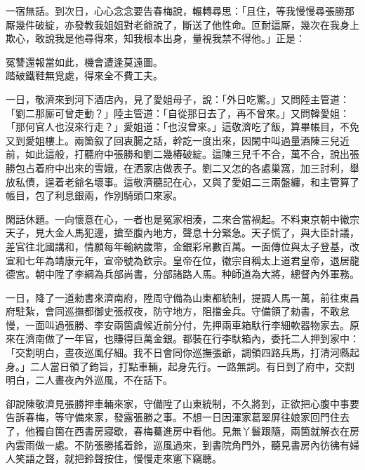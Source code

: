 一宿無話。到次日，心心念念要告春梅說，輾轉尋思：「且住，等我慢慢尋張勝那厮幾件破綻，亦發教我姐姐對老爺說了，斷送了他性命。{}叵耐這厮，幾次在我身上欺心，敢說我是他尋得來，知我根本出身，量視我禁不得他。」正是：

\begin{myquote}
冤讐還報當如此，機會遭逢莫遠圖。\\踏破鐵鞋無覓處，得來全不費工夫。
\end{myquote}

一日，敬濟來到河下酒店內，見了愛姐母子，說：「外日吃驚。」又問陸主管道：「劉二那厮可曾走動？」陸主管道：「自從那日去了，再不曾來。」又問韓愛姐：「那何官人也沒來行走？」愛姐道：「也沒曾來。」這敬濟吃了飯，算畢帳目，不免又到愛姐樓上。兩箇叙了回衷腸之話，幹訖一度出來，因閑中叫過量酒陳三兒近前，如此這般，打聽府中張勝和劉二幾樁破綻。這陳三兒千不合，萬不合，說出張勝包占着府中出來的雪娥，在洒家店做表子。劉二又怎的各處巢窩，加三討利，舉放私債，逞着老爺名壞事。{}這敬濟聽記在心，又與了愛姐二三兩盤纏，和主管算了帳目，包了利息銀兩，作別騎頭口來家。

閑話休題。一向懷意在心，一者也是冤家相湊，二來合當禍起。不料東京朝中徽宗天子，見大金人馬犯邊，搶至腹內地方，聲息十分緊急。天子慌了，與大臣計議，差官往北國講和，情願每年輸納歲幣，金銀彩帛數百萬。一面傳位與太子登基，改宣和七年為靖康元年，宣帝號為欽宗。皇帝在位，徽宗自稱太上道君皇帝，退居龍德宮。朝中陞了李綱為兵部尚書，分部諸路人馬。种師道為大將，總督內外軍務。

一日，降了一道勑書來濟南府，陞周守備為山東都統制，提調人馬一萬，前往東昌府駐紮，會同巡撫都御史張叔夜，防守地方，阻擋金兵。守備領了勑書，不敢怠慢，一面叫過張勝、李安兩箇虞候近前分付，先押兩車箱馱行李細軟器物家去。原來在濟南做了一年官，也賺得巨萬金銀。都裝在行李馱箱內，委托二人押到家中：「交割明白，晝夜巡風仔細。我不日會同你巡撫張爺，調領四路兵馬，打清河縣起身。」二人當日領了鈞旨，打點車輛，起身先行。一路無詞。有日到了府中，交割明白，二人晝夜內外巡風，不在話下。

卻說陳敬濟見張勝押車輛來家，守備陞了山東統制，不久將到，正欲把心腹中事要告訴春梅，等守備來家，發露張勝之事。不想一日因渾家葛翠屏往娘家回門住去了，他獨自箇在西書房寢歇，春梅驀進房中看他。見無丫鬟跟隨，兩箇就解衣在房內雲雨做一處。不防張勝搖着鈴，巡風過來，{}到書院角門外，聽見書房內彷彿有婦人笑語之聲，就把鈴聲按住，慢慢走來窻下竊聽。

